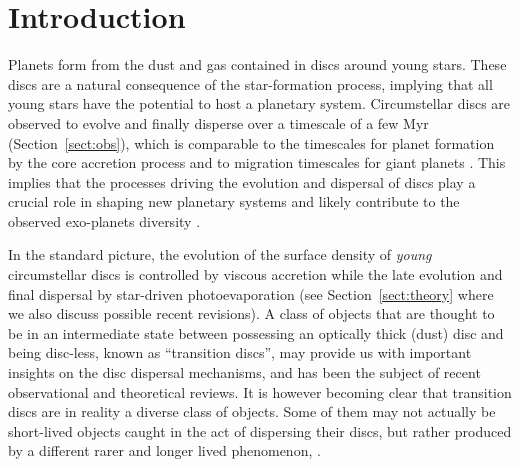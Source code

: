 \documentclass{rsos}
\begin{document}
\section{Introduction}
Planets form from the dust and gas contained in discs around young stars. These discs are a natural consequence of the star-formation process, implying that all young stars have the potential to host a planetary system.
Circumstellar discs are observed to evolve and finally disperse over a timescale of a few Myr (Section~\ref{sect:obs}), which is comparable to the timescales for planet formation by the core accretion process
\cite{2014prpl.conf..643H} and to migration timescales for giant planets
\cite{2014prpl.conf..667B}. This implies that the processes driving the evolution and dispersal of discs play a crucial role in shaping new planetary systems and likely contribute to the observed exo-planets diversity
\cite{2012MNRAS.422L..82A,2012A&A...541A..97M,2015MNRAS.450.3008E}. 

In the standard picture, the evolution of the surface density of {\it young} circumstellar discs is controlled by viscous accretion while the late evolution and final dispersal by star-driven photoevaporation (see Section~\ref{sect:theory} where we also discuss possible recent revisions). A class of objects that are thought to be in an intermediate state between possessing an optically thick (dust) disc and being disc-less, known as ``transition discs'', may provide us with important insights on the disc dispersal mechanisms, and has been the subject of recent observational \cite{2014prpl.conf..497E} and theoretical \cite{2016PASA...33....5O} reviews.
It is however becoming clear that transition discs are in reality a diverse class of objects. Some of them may not actually be short-lived objects caught in the act of dispersing their discs, but rather produced by a different rarer and longer lived phenomenon, \cite{2016PASA...33....5O}. 

\end{document}
